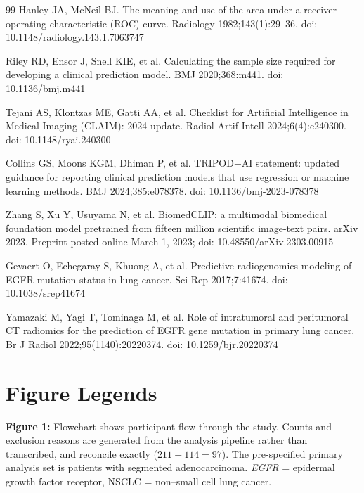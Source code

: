 \documentclass[11pt]{article}
\begin{document}
\begin{thebibliography}{99}
Hanley JA, McNeil BJ. The meaning and use of the area under a receiver operating
characteristic (ROC) curve. Radiology 1982;143(1):29--36.
doi: 10.1148/radiology.143.1.7063747

Riley RD, Ensor J, Snell KIE, et al. Calculating the sample size required for
developing a clinical prediction model. BMJ 2020;368:m441. doi: 10.1136/bmj.m441

Tejani AS, Klontzas ME, Gatti AA, et al. Checklist for Artificial Intelligence in
Medical Imaging (CLAIM): 2024 update. Radiol Artif Intell 2024;6(4):e240300.
doi: 10.1148/ryai.240300

Collins GS, Moons KGM, Dhiman P, et al. TRIPOD+AI statement: updated guidance for
reporting clinical prediction models that use regression or machine learning
methods. BMJ 2024;385:e078378. doi: 10.1136/bmj-2023-078378

Zhang S, Xu Y, Usuyama N, et al. BiomedCLIP: a multimodal biomedical foundation
model pretrained from fifteen million scientific image-text pairs. arXiv 2023.
Preprint posted online March 1, 2023; doi: 10.48550/arXiv.2303.00915

Gevaert O, Echegaray S, Khuong A, et al. Predictive radiogenomics modeling of
EGFR mutation status in lung cancer. Sci Rep 2017;7:41674.
doi: 10.1038/srep41674

Yamazaki M, Yagi T, Tominaga M, et al. Role of intratumoral and peritumoral CT
radiomics for the prediction of EGFR gene mutation in primary lung cancer. Br J
Radiol 2022;95(1140):20220374. doi: 10.1259/bjr.20220374

\end{thebibliography}

\clearpage
\section*{Figure Legends}

\textbf{Figure 1:} Flowchart shows participant flow through the study. Counts and
exclusion reasons are generated from the analysis pipeline rather than
transcribed, and reconcile exactly ($211 - 114 = 97$). The pre-specified primary
analysis set is patients with segmented adenocarcinoma.
\textit{EGFR} = epidermal growth factor receptor, NSCLC = non--small cell lung
cancer.
\end{document}
